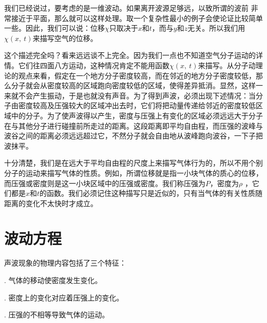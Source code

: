 我们已经说过，要考虑的是一维波动。如果离开波源足够远，以致所谓的波前 非常接近于平面，那么就可以这样处理。取一个复杂性最小的例子会使论证比较简单一些。因此，我们可以说：位移$\chi$只取决于$x$和$t$，而与$y$和$z$无关。所以我们用$\chi(x,~t)$来描写空气的位移。

这个描述完全吗？看来远远谈不上完全。因为我们一点也不知道空气分子运动的详情。它们往四面八方运动，这种情况肯定不能用函数$\chi(x,~t)$来描写。从分子动理论的观点来看，假定在一个地方分子密度较高，而在邻近的地方分子密度较低，那么分子就会从密度较高的区域跑向密度较低的区域，使得差异抵消。显然，这样一来就不会产生振动，于是也就没有声音。为了得到声波，必须出现下述情况：当分子由密度较高及压强较大的区域冲出去时，它们将把动量传递给邻近的密度较低区域中的分子。为了使声波得以产生，密度与压强上有变化的区域必须远远大于分子在与其他分子进行碰撞前所走过的距离。这段距离即平均自由程，而压强的波峰与波谷之间的距离必须远远超过它，不然分子就会自由地从波峰跑向波谷，一下子把波抹平。

十分清楚，我们是在远大于平均自由程的尺度上来描写气体行为的，所以不用个别分子的运动来描写气体的性质。例如，所谓位移就是指一小块气体的质心的位移，而压强或密度则是这一小块区域中的压强或密度。我们称压强为$P$，密度为$\rho$ ，它们都是$x$和$t$的函数。我们必须记住这种描写只是近似的，只有当气体的有关性质随距离的变化不太快时才成立。

\section{波动方程}

声波现象的物理内容包括了三个特征：

\uppercase\expandafter{}. 气体的移动使密度发生变化。

\uppercase\expandafter{}. 密度上的变化对应着压强上的变化。

\uppercase\expandafter{}. 压强的不相等导致气体的运动。

